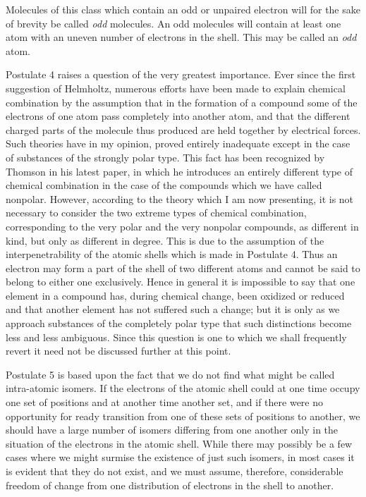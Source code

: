 \documentclass[11pt]{memoir}
\begin{document}
Molecules of this class which contain an odd or unpaired electron will for the sake of brevity be called \emph{odd} molecules.  An odd molecules will contain at least one atom with an uneven number of electrons in the shell.  This may be called an \emph{odd} atom.

Postulate 4 raises a question of the very greatest importance.  Ever since the first suggestion of Helmholtz, numerous efforts have been made to explain chemical combination by the assumption that in the formation of a compound some of the electrons of one atom pass completely into another atom, and that the different charged parts of the molecule thus produced are held together by electrical forces.  Such theories have in my opinion, proved entirely inadequate except in the case of substances of the strongly polar type.  This fact has been recognized by Thomson in his latest paper, in which he introduces an entirely different type of chemical combination in the case of the compounds which we have called nonpolar.  However, according to the theory which I am now presenting, it is not necessary to consider the two extreme types of chemical combination, corresponding to the very polar and the very nonpolar compounds, as different in kind, but only as different in degree.  This is due to the assumption of the interpenetrability of the atomic shells which is made in Postulate 4.  Thus an electron may form a part of the shell of two different atoms and cannot be said to belong to either one exclusively.  Hence in general it is impossible to say that one element in a compound has, during chemical change, been oxidized or reduced and that another element has not suffered such a change; but it is only as we approach substances of the completely polar type that such distinctions become less and less ambiguous.  Since this question is one to which we shall frequently revert it need not be discussed further at this point.

Postulate 5 is based upon the fact that we do not find what might be called intra-atomic isomers.  If the electrons of the atomic shell could at one time occupy one set of positions and at another time another set, and if there were no opportunity for ready transition from one of these sets of positions to another, we should have a large number of isomers differing from one another only in the situation of the electrons in the atomic shell.  While there may possibly be a few cases where we might surmise the existence of just such isomers, in most cases it is evident that they do not exist, and we must assume, therefore, considerable freedom of change from one distribution of electrons in the shell to another.
\end{document}
